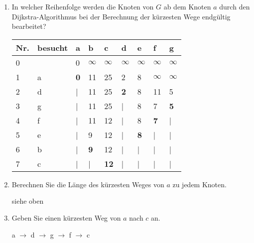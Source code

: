 \documentclass{bschlangaul-aufgabe}
\begin{document}
\begin{enumerate}

%

\item In welcher Reihenfolge werden die Knoten von $G$ ab dem Knoten $a$
durch den Dijkstra-Algorithmus bei der Berechnung der kürzesten Wege
endgültig bearbeitet?

\begin{bAntwort}
\begin{tabular}{lllllllll}
\bf{Nr.}     & \bf{besucht} & \bf{a}       & \bf{b}       & \bf{c}       & \bf{d}       & \bf{e}       & \bf{f}       & \bf{g}       \\
\hline
0            &              & 0            & $\infty$     & $\infty$     & $\infty$     & $\infty$     & $\infty$     & $\infty$     \\
1            & a            & \bf{0}       & 11           & 25           & 2            & 8            & $\infty$     & $\infty$     \\
2            & d            & |            & 11           & 25           & \bf{2}       & 8            & 11           & 5            \\
3            & g            & |            & 11           & 25           & |            & 8            & 7            & \bf{5}       \\
4            & f            & |            & 11           & 12           & |            & 8            & \bf{7}       & |            \\
5            & e            & |            & 9            & 12           & |            & \bf{8}       & |            & |            \\
6            & b            & |            & \bf{9}       & 12           & |            & |            & |            & |            \\
7            & c            & |            & |            & \bf{12}      & |            & |            & |            & |            \\
\end{tabular}
\end{bAntwort}

%

\item Berechnen Sie die Länge des kürzesten Weges von $a$ zu jedem
Knoten.

\begin{bAntwort}
siehe oben
\end{bAntwort}

%

\item Geben Sie einen kürzesten Weg von $a$ nach $c$ an.

\begin{bAntwort}
a $\rightarrow$ d $\rightarrow$ g $\rightarrow$ f $\rightarrow$ c
\end{bAntwort}
\end{enumerate}
\end{document}
